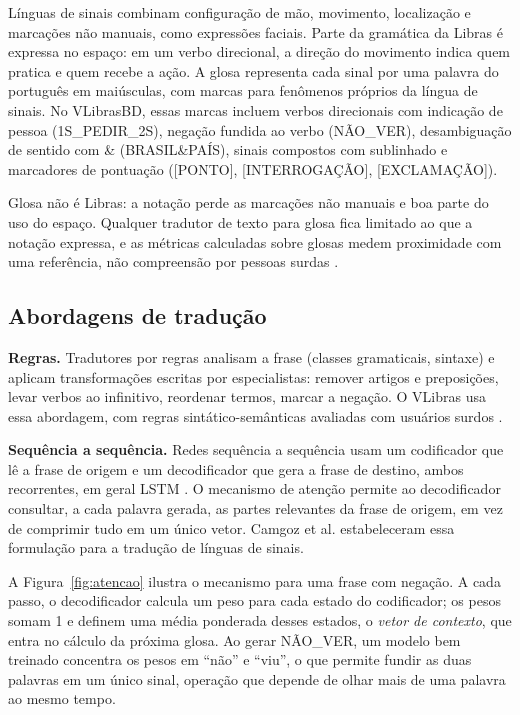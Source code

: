 \documentclass[12pt]{article}
\newcommand{\gl}[1]{\textsf{\small #1}}
\begin{document}
Línguas de sinais combinam configuração de mão, movimento, localização e marcações não manuais, como expressões faciais. Parte da gramática da Libras é expressa no espaço: em um verbo direcional, a direção do movimento indica quem pratica e quem recebe a ação. A glosa representa cada sinal por uma palavra do português em maiúsculas, com marcas para fenômenos próprios da língua de sinais. No VLibrasBD, essas marcas incluem verbos direcionais com indicação de pessoa (\gl{1S\_PEDIR\_2S}), negação fundida ao verbo (\gl{NÃO\_VER}), desambiguação de sentido com \gl{\&} (\gl{BRASIL\&PAÍS}), sinais compostos com sublinhado e marcadores de pontuação (\gl{[PONTO]}, \gl{[INTERROGAÇÃO]}, \gl{[EXCLAMAÇÃO]}).

Glosa não é Libras: a notação perde as marcações não manuais e boa parte do uso do espaço. Qualquer tradutor de texto para glosa fica limitado ao que a notação expressa, e as métricas calculadas sobre glosas medem proximidade com uma referência, não compreensão por pessoas surdas \cite{muller}.

\subsection{Abordagens de tradução}

\textbf{Regras.} Tradutores por regras analisam a frase (classes gramaticais, sintaxe) e aplicam transformações escritas por especialistas: remover artigos e preposições, levar verbos ao infinitivo, reordenar termos, marcar a negação. O VLibras usa essa abordagem, com regras sintático-semânticas avaliadas com usuários surdos \cite{lima2022}.

\textbf{Sequência a sequência.} Redes sequência a sequência \cite{sutskever} usam um codificador que lê a frase de origem e um decodificador que gera a frase de destino, ambos recorrentes, em geral LSTM \cite{lstm}. O mecanismo de atenção \cite{bahdanau} permite ao decodificador consultar, a cada palavra gerada, as partes relevantes da frase de origem, em vez de comprimir tudo em um único vetor. Camgoz et al. \cite{camgoz} estabeleceram essa formulação para a tradução de línguas de sinais.

A Figura~\ref{fig:atencao} ilustra o mecanismo para uma frase com negação. A cada passo, o decodificador calcula um peso para cada estado do codificador; os pesos somam 1 e definem uma média ponderada desses estados, o \emph{vetor de contexto}, que entra no cálculo da próxima glosa. Ao gerar \gl{NÃO\_VER}, um modelo bem treinado concentra os pesos em ``não'' e ``viu'', o que permite fundir as duas palavras em um único sinal, operação que depende de olhar mais de uma palavra ao mesmo tempo.
\end{document}
